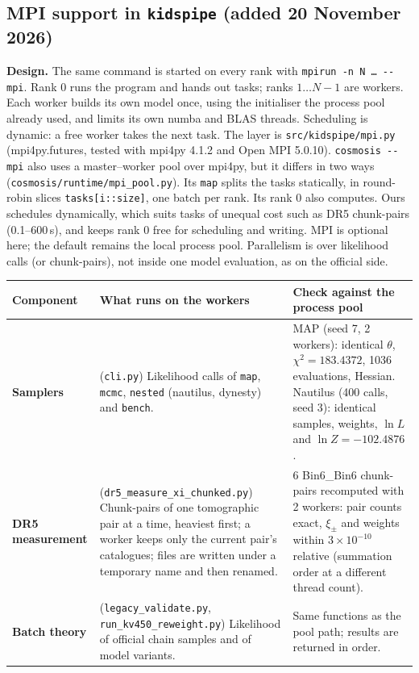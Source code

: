 \documentclass[10pt,a4paper]{article}
\newcommand{\file}[1]{{\small\texttt{#1}}}
\begin{document}
\subsection{MPI support in \texorpdfstring{\texttt{kidspipe}}{kidspipe} (added 20 November 2026)}\label{sec:mpi}
\textbf{Design.} The same command is started on every rank with \texttt{mpirun -n N \dots\ -{}-mpi}. Rank 0 runs the program and hands out tasks; ranks $1\ldots N-1$ are workers. Each worker builds its own model once, using the initialiser the process pool already used, and limits its own numba and BLAS threads. Scheduling is dynamic: a free worker takes the next task. The layer is \file{src/kidspipe/mpi.py} (mpi4py.futures, tested with mpi4py 4.1.2 and Open MPI 5.0.10). \texttt{cosmosis -{}-mpi} also uses a master--worker pool over mpi4py, but it differs in two ways (\file{cosmosis/runtime/mpi\_pool.py}). Its \texttt{map} splits the tasks statically, in round-robin slices \texttt{tasks[i::size]}, one batch per rank. Its rank 0 also computes. Ours schedules dynamically, which suits tasks of unequal cost such as DR5 chunk-pairs (0.1--600\,s), and keeps rank 0 free for scheduling and writing. MPI is optional here; the default remains the local process pool. Parallelism is over likelihood calls (or chunk-pairs), not inside one model evaluation, as on the official side.

\begin{tabularx}{\textwidth}{@{}>{\bfseries}p{2.6cm}YY@{}}
\toprule
Component & What runs on the workers & Check against the process pool \\
\midrule
Samplers & (\file{cli.py}) Likelihood calls of \texttt{map}, \texttt{mcmc}, \texttt{nested} (nautilus, dynesty) and \texttt{bench}. & MAP (seed 7, 2 workers): identical $\theta$, $\chi^2=183.4372$, 1036 evaluations, Hessian. Nautilus (400 calls, seed 3): identical samples, weights, $\ln L$ and $\ln Z=-102.4876$. \\
DR5 measurement & (\file{dr5\_measure\_xi\_chunked.py}) Chunk-pairs of one tomographic pair at a time, heaviest first; a worker keeps only the current pair's catalogues; files are written under a temporary name and then renamed. & 6 Bin6\_Bin6 chunk-pairs recomputed with 2 workers: pair counts exact, $\xi_\pm$ and weights within $3\times10^{-10}$ relative (summation order at a different thread count). \\
Batch theory & (\file{legacy\_validate.py}, \file{run\_kv450\_reweight.py}) Likelihood of official chain samples and of model variants. & Same functions as the pool path; results are returned in order. \\
\bottomrule
\end{tabularx}
\end{document}
